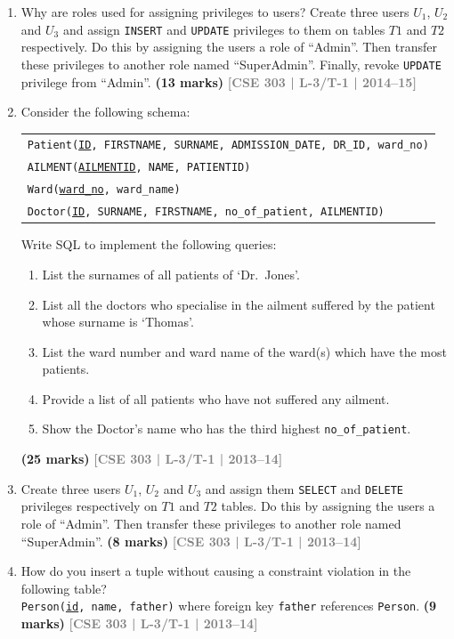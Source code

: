 \documentclass[12pt]{article}
\newcommand{\yr}[1]{\hfill\textcolor{gray}{\small\textbf{[#1]}}}
\newcommand{\mk}[1]{\textcolor{orange!70!black}{\small\textbf{(#1 marks)}}}
\begin{document}
\begin{enumerate}
\item Why are roles used for assigning privileges to users? Create three users $U_1$, $U_2$ and $U_3$ and assign \texttt{INSERT} and \texttt{UPDATE} privileges to them on tables $T1$ and $T2$ respectively. Do this by assigning the users a role of ``Admin''. Then transfer these privileges to another role named ``SuperAdmin''. Finally, revoke \texttt{UPDATE} privilege from ``Admin''.
\mk{13} \yr{CSE 303 | L-3/T-1 | 2014--15}


\item Consider the following schema:
\begin{center}
\begin{tabular}{l}
\texttt{Patient(\underline{ID}, FIRSTNAME, SURNAME, ADMISSION\_DATE, DR\_ID, ward\_no)}\\
\texttt{AILMENT(\underline{AILMENTID}, NAME, PATIENTID)}\\
\texttt{Ward(\underline{ward\_no}, ward\_name)}\\
\texttt{Doctor(\underline{ID}, SURNAME, FIRSTNAME, no\_of\_patient, AILMENTID)}
\end{tabular}
\end{center}
Write SQL to implement the following queries:
\begin{enumerate}
  \item List the surnames of all patients of `Dr.\ Jones'.
  \item List all the doctors who specialise in the ailment suffered by the patient whose surname is `Thomas'.
  \item List the ward number and ward name of the ward(s) which have the most patients.
  \item Provide a list of all patients who have not suffered any ailment.
  \item Show the Doctor's name who has the third highest \texttt{no\_of\_patient}.
\end{enumerate}
\mk{25} \yr{CSE 303 | L-3/T-1 | 2013--14}


\item Create three users $U_1$, $U_2$ and $U_3$ and assign them \texttt{SELECT} and \texttt{DELETE} privileges respectively on $T1$ and $T2$ tables. Do this by assigning the users a role of ``Admin''. Then transfer these privileges to another role named ``SuperAdmin''.
\mk{8} \yr{CSE 303 | L-3/T-1 | 2013--14}


\item How do you insert a tuple without causing a constraint violation in the following table?\\
\texttt{Person(\underline{id}, name, father)} where foreign key \texttt{father} references \texttt{Person}.
\mk{9} \yr{CSE 303 | L-3/T-1 | 2013--14}



\end{enumerate}
\end{document}
